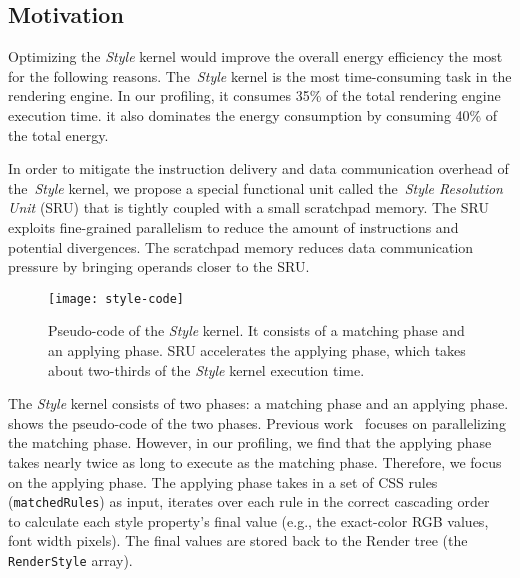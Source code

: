 
\subsection{Motivation}
\label{sec:sru:motivation}

Optimizing the \textit{Style} kernel would improve the overall energy efficiency the most for the following reasons. The~\textit{Style} kernel is the most time-consuming task in the rendering engine. In our profiling, it consumes 35\% of the total rendering engine execution time. it also dominates the energy consumption by consuming 40\% of the total energy.

In order to mitigate the instruction delivery and data communication overhead of the~\textit{Style} kernel, we propose a special functional unit called the~\textit{Style Resolution Unit} (SRU) that is tightly coupled with a small scratchpad memory. The SRU exploits fine-grained parallelism to reduce the amount of instructions and potential divergences. The scratchpad memory reduces data communication pressure by bringing operands closer to the SRU.

\begin{figure}[t]
\centering
\captionsetup{width=\columnwidth}
\texttt{[image: style-code]}
\caption{Pseudo-code of the \textit{Style} kernel. It consists of a matching phase and an applying phase. SRU accelerates the applying phase, which takes about two-thirds of the \textit{Style} kernel execution time.}
\label{fig:style-code}
\end{figure}

The \textit{Style} kernel consists of two phases: a matching phase and an applying phase.  shows the pseudo-code of the two phases. Previous work~\cite{zoomm,ParallelBrowser} focuses on parallelizing the matching phase. However, in our profiling, we find that the applying phase takes nearly twice as long to execute as the matching phase. Therefore, we focus on the applying phase. The applying phase takes in a set of CSS rules (\texttt{matchedRules}) as input, iterates over each rule in the correct cascading order~\cite{cascading} to calculate each style property's final value (e.g., the exact-color RGB values, font width pixels). The final values are stored back to the Render tree (the \texttt{RenderStyle} array).

